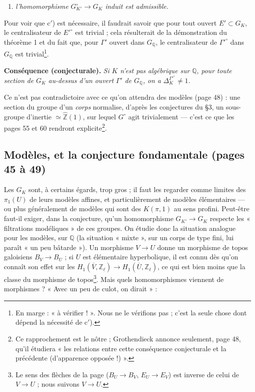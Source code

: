 \documentclass[11pt,a4paper]{article}
\begin{document}
\begin{enumerate}
\item[c$'$)] \emph{l'homomorphisme $G_{K'}^{\circ} \to G_K$ induit est
admissible.}
\end{enumerate}

Pour voir que c$'$) est nécessaire, il faudrait savoir que pour tout ouvert
$E' \subset G_K$, le centralisateur de $E'^{\circ}$ est trivial ; cela
résulterait de la démonstration du théorème 1 et du fait que, pour $\Gamma'$
ouvert dans $G_{\mathbb{Q}}$, le centralisateur de $\Gamma'^{\circ}$ dans
$G_{\mathbb{Q}}$ est trivial\footnote{En marge : « à vérifier ! ». Nous ne le
vérifions pas ; c'est la seule chose dont dépend la nécessité de c$'$).}.

\textbf{Conséquence (conjecturale).} \emph{Si $K$ n'est pas algébrique sur
$\mathbb{Q}$, pour toute section de $G_K$ au-dessus d'un ouvert $\Gamma'$ de
$G_{\mathbb{Q}}$, on a $\Delta_K^{\Gamma'^{\circ}} \ne 1$.}

Ce n'est pas contradictoire avec ce qu'on attendra des modèles (page 48) :
une section du groupe d'un \emph{corps} normalise, d'après les conjectures
du §3, un sous-groupe d'inertie $\simeq \widehat{\mathbb{Z}}(1)$, sur lequel
$G^{\circ}$ agit trivialement — c'est ce que les pages 55 et 60 rendront
explicite\footnote{Ce rapprochement est le nôtre ; Grothendieck annonce
seulement, page 48, qu'il étudiera « les relations entre cette conséquence
conjecturale et la précédente (d'apparence opposée !) ».}.

\subsection*{Modèles, et la conjecture fondamentale (pages 45 à 49)}

Les $G_K$ sont, à certains égards, trop gros ; il faut les regarder comme
limites des $\pi_1(U)$ de leurs modèles affines, et particulièrement de
modèles élémentaires — ou plus généralement de modèles qui sont des
$K(\pi, 1)$ au sens profini. Peut-être faut-il exiger, dans la conjecture,
qu'un homomorphisme $G_{K'} \to G_K$ respecte les « filtrations
modéliques » de ces groupes. On étudie donc la situation analogue pour les
modèles, sur $\mathbb{Q}$ (la situation « mixte », sur un corps de type fini,
lui paraît « un peu bâtarde »). Un morphisme $V \to U$ donne un morphisme de
topos galoisiens $B_V \to B_U$ ; si $U$ est élémentaire hyperbolique, il est
connu dès qu'on connaît son effet sur les $H_1(\overline{V}, \mathbb{Z}_\ell)
\to H_1(\overline{U}, \mathbb{Z}_\ell)$, ce qui est bien moins que la classe
du morphisme de topos\footnote{Le sens des flèches de la page ($B_U \to B_V$,
$E_U \to E_V$) est inverse de celui de $V \to U$ ; nous suivons $V \to U$.}.
Mais quels homomorphismes viennent de morphismes ? « Avec un peu de culot, on
dirait » :
\end{document}
